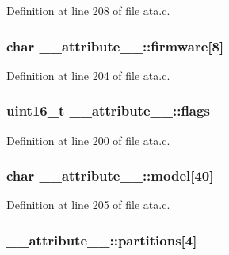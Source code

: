 Definition at line 208 of file ata.\+c.

\subsubsection[{\texorpdfstring{firmware}{firmware}}]{\setlength{\rightskip}{0pt plus 5cm}char \+\_\+\+\_\+attribute\+\_\+\+\_\+\+::firmware\mbox{[}8\mbox{]}}\hypertarget{struct____attribute_____adad0e454dd0c9a6d03d0f4349e9453f8}{}\label{struct____attribute_____adad0e454dd0c9a6d03d0f4349e9453f8}


Definition at line 204 of file ata.\+c.

\subsubsection[{\texorpdfstring{flags}{flags}}]{\setlength{\rightskip}{0pt plus 5cm}uint16\+\_\+t \+\_\+\+\_\+attribute\+\_\+\+\_\+\+::flags}\hypertarget{struct____attribute_____aa0943b75cfebf20ce431adfbedf9f8c4}{}\label{struct____attribute_____aa0943b75cfebf20ce431adfbedf9f8c4}


Definition at line 200 of file ata.\+c.

\subsubsection[{\texorpdfstring{model}{model}}]{\setlength{\rightskip}{0pt plus 5cm}char \+\_\+\+\_\+attribute\+\_\+\+\_\+\+::model\mbox{[}40\mbox{]}}\hypertarget{struct____attribute_____a0f032985bf7b712101efd1179aa4bf9f}{}\label{struct____attribute_____a0f032985bf7b712101efd1179aa4bf9f}


Definition at line 205 of file ata.\+c.

\subsubsection[{\texorpdfstring{partitions}{partitions}}]{ \+\_\+\+\_\+attribute\+\_\+\+\_\+\+::partitions\mbox{[}4\mbox{]}}\hypertarget{struct____attribute_____aa806510421b3faee3fdc3de2dad5e822}{}\label{struct____attribute_____aa806510421b3faee3fdc3de2dad5e822}



